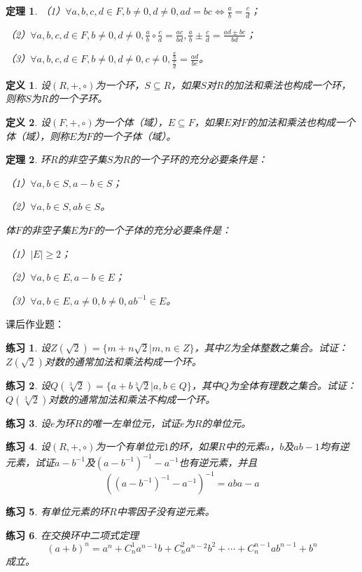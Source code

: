 \documentclass{article}
\newtheorem{Def}{定义}
\newtheorem{Thm}{定理}
\newtheorem{Exercise}{练习}
\begin{document}
\begin{CJK*}{UTF8}{gbsn}
\begin{Thm}
  （1）$\forall a,b,c,d\in F, b\neq 0, d\neq 0, ad=bc \Leftrightarrow \frac{a}{b} = \frac{c}{d}$；

  （2）$\forall a,b,c,d\in F, b\neq 0, d\neq 0, \frac{a}{b}\circ \frac{c}{d}=\frac{ac}{bd}, \frac{a}{b}\pm\frac{c}{d}=\frac{ad\pm bc}{bd}$；

  （3）$\forall a,b,c,d\in F, b\neq 0, d\neq 0,c\neq 0, \frac{\frac{a}{b}}{\frac{c}{d}}=\frac{ad}{bc}$。
\end{Thm}

\begin{Def}
  设$(R,+,\circ)$为一个环，$S\subseteq R$，如果$S$对$R$的加法和乘法也构成一个环，则称$S$为$R$的一个子环。
\end{Def}

\begin{Def}
  设$(F,+,\circ)$为一个体（域），$E\subseteq F$，如果$E$对$F$的加法和乘法也构成一个体（域），则称$E$为$F$的一个子体（域）。
\end{Def}
\begin{Thm}
  环$R$的非空子集$S$为$R$的一个子环的充分必要条件是：

  （1）$\forall a,b\in S, a-b\in S$；

  （2）$\forall a,b\in S, ab\in S$。

  体$F$的非空子集$E$为$F$的一个子体的充分必要条件是：

  （1）$|E|\geq 2$；

  （2）$\forall a,b \in E, a-b\in E$；

  （3）$\forall a,b \in E, a\neq 0, b\neq 0, ab^{-1}\in E$。
\end{Thm}
课后作业题：
\begin{Exercise}
  设$Z(\sqrt{2})=\{m+n\sqrt{2}|m,n\in Z\}$，其中$Z$为全体整数之集合。试证：$Z(\sqrt{2})$对数的通常加法和乘法构成一个环。
\end{Exercise}
\begin{Exercise}
  设$Q(\sqrt[3]{2})=\{a+b\sqrt[3]{2}|a,b\in Q\}$，其中$Q$为全体有理数之集合。试证：$Q(\sqrt[3]{2})$对数的通常加法和乘法不构成一个环。
\end{Exercise}
\begin{Exercise}
设$e$为环$R$的唯一左单位元，试证$e$为$R$的单位元。
\end{Exercise}

\begin{Exercise}
设$(R,+,\circ)$为一个有单位元$1$的环，如果$R$中的元素$a$，$b$及$ab-1$均有逆元素，试证$a-b^{-1}$及$(a-b^{-1})^{-1}-a^{-1}$也有逆元素，并且
\[((a-b^{-1})^{-1}-a^{-1})^{-1}=aba-a\]
\end{Exercise}
\begin{Exercise}
  有单位元素的环$R$中零因子没有逆元素。
\end{Exercise}
\begin{Exercise}
  在交换环中二项式定理
\[(a+b)^n=a^n+C_n^1a^{n-1}b+C_n^2a^{n-2}b^2+\cdots+C_n^{n-1}ab^{n-1}+b^n\]
  成立。
\end{Exercise}
\end{CJK*}
\end{document}
